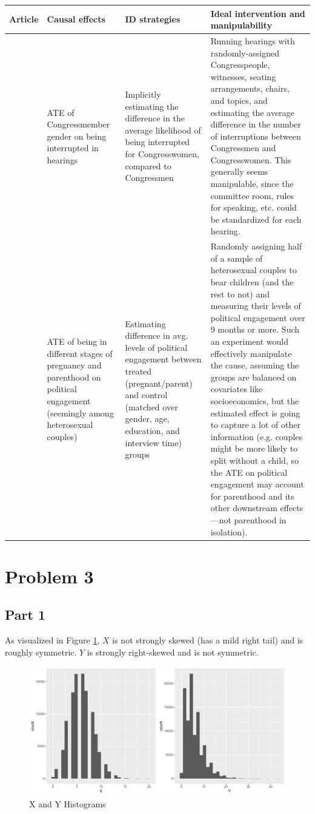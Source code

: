 \documentclass[12pt]{article}
\begin{document}
\begin{table}[H]
\begin{tabular}{p{1in}|p{1in}|p{1.5in}|p{3in}}
Article & Causal effects & ID strategies & Ideal intervention and manipulability\\
\hline
\citet{Miller2023} & ATE of Congressmember gender on being interrupted in hearings & Implicitly estimating the difference in the average likelihood of being interrupted for Congresswomen, compared to Congressmen & Running hearings with randomly-assigned Congresspeople, witnesses, seating arrangements, chairs, and topics, and estimating the average difference in the number of interruptions between Congressmen and Congresswomen. This generally seems manipulable, since the committee room, rules for speaking, etc. could be standardized for each hearing.\\
\hline
\citet{Naurin2023} & ATE of being in different stages of pregnancy and parenthood on political engagement (seemingly among heterosexual couples) & Estimating difference in avg. levels of political engagement between treated (pregnant/parent) and control (matched over gender, age, education, and interview time) groups & Randomly assigning half of a sample of heterosexual couples to bear children (and the rest to not) and measuring their levels of political engagement over 9 months or more. Such an experiment would effectively manipulate the cause, assuming the groups are balanced on covariates like socioeconomics, but the estimated effect is going to capture a lot of other information (e.g. couples might be more likely to split without a child, so the ATE on political engagement may account for parenthood and its other downstream effects---not parenthood in isolation).
\end{tabular}
\end{table}

\section*{Problem 3}

\subsection*{Part 1}

As visualized in Figure \ref{fig:hists}, $X$ is not strongly skewed (has a mild right tail) and is roughly symmetric. $Y$ is strongly right-skewed and is not symmetric.

\begin{figure}[H]
\caption{X and Y Histograms}
\label{fig:hists}
\centering
\includegraphics[width = .8\textwidth]{hw1_hists.pdf}
\end{figure}
\end{document}

